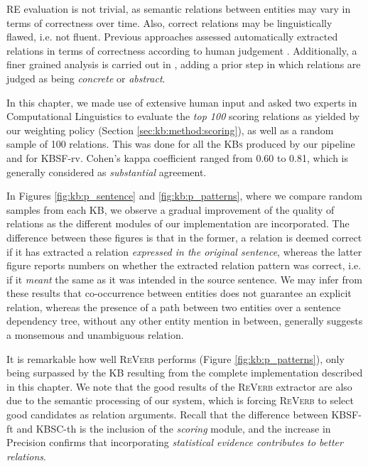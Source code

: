 \textsc{RE} evaluation is not trivial, as semantic relations between entities may vary in terms of correctness over time. Also, correct relations may be linguistically flawed, i.e. not fluent. Previous approaches assessed automatically extracted relations in terms of correctness according to human judgement \cite{Fader2011,Mausam2012}. Additionally, a finer grained analysis is carried out in \cite{Bankoetal2007}, adding a prior step in which relations are judged as being \textit{concrete} or \textit{abstract}.

In this chapter, we made use of extensive human input and asked two experts in Computational Linguistics to evaluate the \textit{top 100} scoring relations as yielded by our weighting policy (Section \ref{sec:kb:method:scoring}), as well as a random sample of 100 relations. This was done for all the \textsc{KBs} produced by our pipeline and for \textsc{KBSF}-rv. Cohen's kappa coefficient ranged from 0.60 to 0.81, which is generally considered as \textit{substantial} agreement.


In Figures \ref{fig:kb:p_sentence} and \ref{fig:kb:p_patterns}, where we compare random samples from each \textsc{KB}, we observe a gradual improvement of the quality of relations as the different modules of our implementation are incorporated. The difference between these figures is that in the former, a relation is deemed correct if it has extracted a relation \textit{expressed in the original sentence}, whereas the latter figure reports numbers on whether the extracted relation pattern was correct, i.e. if it \textit{meant} the same as it was intended in the source sentence. We may infer from these results that co-occurrence between entities does not guarantee an explicit relation, whereas the presence of a path between two entities over a sentence dependency tree, without any other entity mention in between, generally suggests a monsemous and unambiguous relation.

It is remarkable how well \textsc{ReVerb} performs (Figure \ref{fig:kb:p_patterns}), only being surpassed by the \textsc{KB} resulting from the complete implementation described in this chapter. We note that the good results of the \textsc{ReVerb} extractor are also due to the semantic processing of our system, which is forcing \textsc{ReVerb} to select good candidates as relation arguments. Recall that the difference between \textsc{KBSF}-ft and \textsc{KBSC}-th is the inclusion of the \textit{scoring} module, and the increase in Precision confirms that incorporating \textit{statistical evidence contributes to better relations}.

